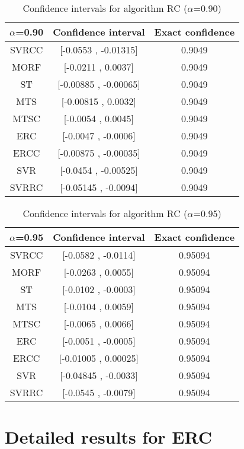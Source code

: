 \documentclass[a4paper,10pt]{article}
\begin{document}
\begin{table}[!htp]
\centering\small
\begin{tabular}{
|c|c|c|}
\hline
 $\alpha$=0.90 & Confidence interval & Exact confidence \\ \hline 
SVRCC & [-0.0553 , -0.01315] & 0.9049\\ \hline 
MORF & [-0.0211 , 0.0037] & 0.9049\\ \hline 
ST & [-0.00885 , -0.00065] & 0.9049\\ \hline 
MTS & [-0.00815 , 0.0032] & 0.9049\\ \hline 
MTSC & [-0.0054 , 0.0045] & 0.9049\\ \hline 
ERC & [-0.0047 , -0.0006] & 0.9049\\ \hline 
ERCC & [-0.00875 , -0.00035] & 0.9049\\ \hline 
SVR & [-0.0454 , -0.00525] & 0.9049\\ \hline 
SVRRC & [-0.05145 , -0.0094] & 0.9049\\ \hline 

\end{tabular}
\caption{Confidence intervals for algorithm RC ($\alpha$=0.90)}
\end{table}
\begin{table}[!htp]
\centering\small
\begin{tabular}{
|c|c|c|}
\hline
 $\alpha$=0.95 & Confidence interval & Exact confidence \\ \hline 
SVRCC & [-0.0582 , -0.0114] & 0.95094\\ \hline 
MORF & [-0.0263 , 0.0055] & 0.95094\\ \hline 
ST & [-0.0102 , -0.0003] & 0.95094\\ \hline 
MTS & [-0.0104 , 0.0059] & 0.95094\\ \hline 
MTSC & [-0.0065 , 0.0066] & 0.95094\\ \hline 
ERC & [-0.0051 , -0.0005] & 0.95094\\ \hline 
ERCC & [-0.01005 , 0.00025] & 0.95094\\ \hline 
SVR & [-0.04845 , -0.0033] & 0.95094\\ \hline 
SVRRC & [-0.0545 , -0.0079] & 0.95094\\ \hline 

\end{tabular}
\caption{Confidence intervals for algorithm RC ($\alpha$=0.95)}
\end{table}

 \clearpage 


\section{Detailed results for ERC}
\end{document}
